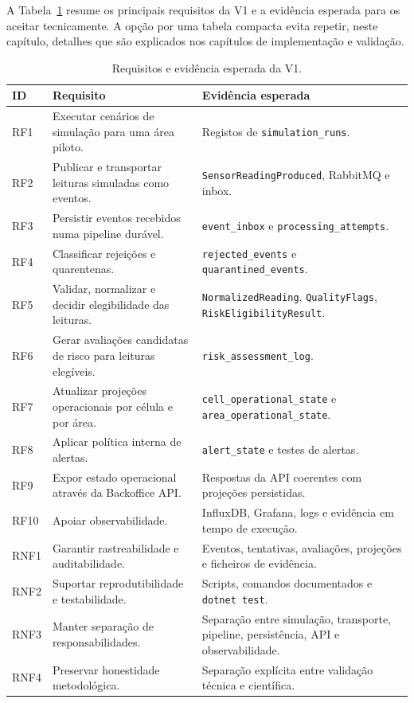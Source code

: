 A Tabela~\ref{tab:v1-requirements} resume os principais requisitos da V1 e a evidência esperada para os aceitar tecnicamente. A opção por uma tabela compacta evita repetir, neste capítulo, detalhes que são explicados nos capítulos de implementação e validação.

\begin{table}[h]
\centering
\caption{Requisitos e evidência esperada da V1.}
\label{tab:v1-requirements}
\begin{tabular}{p{} p{} p{}}
\hline
\textbf{ID} & \textbf{Requisito} & \textbf{Evidência esperada} \\
\hline
RF1 & Executar cenários de simulação para uma área piloto. & Registos de \texttt{simulation\_runs}. \\
RF2 & Publicar e transportar leituras simuladas como eventos. & \texttt{SensorReadingProduced}, RabbitMQ e inbox. \\
RF3 & Persistir eventos recebidos numa pipeline durável. & \texttt{event\_inbox} e \texttt{processing\_attempts}. \\
RF4 & Classificar rejeições e quarentenas. & \texttt{rejected\_events} e \texttt{quarantined\_events}. \\
RF5 & Validar, normalizar e decidir elegibilidade das leituras. & \texttt{NormalizedReading}, \texttt{QualityFlags}, \texttt{RiskEligibilityResult}. \\
RF6 & Gerar avaliações candidatas de risco para leituras elegíveis. & \texttt{risk\_assessment\_log}. \\
RF7 & Atualizar projeções operacionais por célula e por área. & \texttt{cell\_operational\_state} e \texttt{area\_operational\_state}. \\
RF8 & Aplicar política interna de alertas. & \texttt{alert\_state} e testes de alertas. \\
RF9 & Expor estado operacional através da Backoffice API. & Respostas da API coerentes com projeções persistidas. \\
RF10 & Apoiar observabilidade. & InfluxDB, Grafana, logs e evidência em tempo de execução. \\
RNF1 & Garantir rastreabilidade e auditabilidade. & Eventos, tentativas, avaliações, projeções e ficheiros de evidência. \\
RNF2 & Suportar reprodutibilidade e testabilidade. & Scripts, comandos documentados e \texttt{dotnet test}. \\
RNF3 & Manter separação de responsabilidades. & Separação entre simulação, transporte, pipeline, persistência, API e observabilidade. \\
RNF4 & Preservar honestidade metodológica. & Separação explícita entre validação técnica e científica. \\
\hline
\end{tabular}
\end{table}

